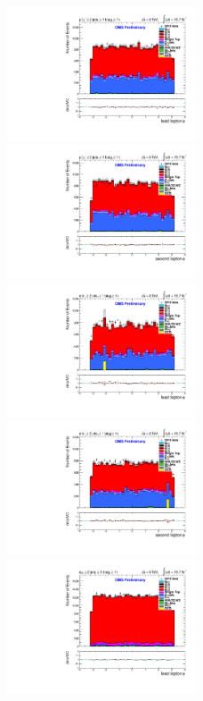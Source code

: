 \documentclass[oneside, a4paper, 11pt, ]{report}
\begin{document}
\begin{figure}
\includegraphics[width=0.5\textwidth]{Plots/ControlPlots/TTbarDiLeptonAnalysis/MuMu/DiLepton/LeadLepton_Phi_splitTTbar_ratio.pdf}
\includegraphics[width=0.5\textwidth]{Plots/ControlPlots/TTbarDiLeptonAnalysis/MuMu/DiLepton/SecondLepton_Phi_splitTTbar_ratio.pdf}\\
\includegraphics[width=0.5\textwidth]{Plots/ControlPlots/TTbarDiLeptonAnalysis/EE/DiLepton/LeadLepton_Phi_splitTTbar_ratio.pdf}
\includegraphics[width=0.5\textwidth]{Plots/ControlPlots/TTbarDiLeptonAnalysis/EE/DiLepton/SecondLepton_Phi_splitTTbar_ratio.pdf}\\
\includegraphics[width=0.5\textwidth]{Plots/ControlPlots/TTbarDiLeptonAnalysis/EMu/DiLepton/LeadLepton_Phi_splitTTbar_ratio.pdf}

\end{figure}
\end{document}

